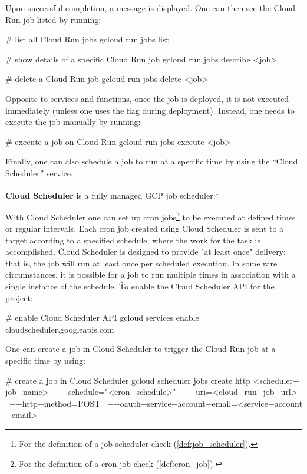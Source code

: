 Upon successful completion, a message is displayed. One can then see the Cloud Run job listed by running:
\begin{bash}
# list all Cloud Run jobs
gcloud run jobs list
\end{bash}

\begin{bash}
# show details of a specific Cloud Run job
gcloud run jobs describe <job>
\end{bash}

\begin{bash}
# delete a Cloud Run job
gcloud run jobs delete <job>
\end{bash}

Opposite to services and functions, once the job is deployed, it is not executed immediately (unless one uses the
 flag during deployment). Instead, one needs to execute the job manually by running:
\begin{bash}
# execute a job on Cloud Run
gcloud run jobs execute <job>
\end{bash}

Finally, one can also schedule a job to run at a specific time by using the ``Cloud Scheduler'' service.

\textbf{Cloud Scheduler} is a fully managed GCP job scheduler.\footnote{For the definition of a job scheduler check
(\ref{def:job_scheduler}).}
\ed

With Cloud Scheduler one can set up cron jobs\footnote{For the definition of a cron job check (\ref{def:cron_job}).} to
be executed at defined times or regular intervals. Each cron job created using Cloud Scheduler is sent to a target
according to a specified schedule, where the work for the task is accomplished. \v

Cloud Scheduler is designed to provide "at least once" delivery; that is, the job will run at least once per
scheduled execution. In some rare circumstances, it is possible for a job to run multiple times in association with
a single instance of the schedule. \v

To enable the Cloud Scheduler API for the project:
\begin{bash}
# enable Cloud Scheduler API
gcloud services enable cloudscheduler.googleapis.com
\end{bash}

One can create a job in Cloud Scheduler to trigger the Cloud Run job at a specific time by using:
\begin{bash}
# create a job in Cloud Scheduler
gcloud scheduler jobs create http <scheduler$-$job$-$name> \
    $-$$-$schedule="<cron$-$schedule>" \
    $-$$-$uri=<cloud$-$run$-$job$-$url> \
    $-$$-$http$-$method=POST \
    $-$$-$oauth$-$service$-$account$-$email=<service$-$account$-$email>
\end{bash}


